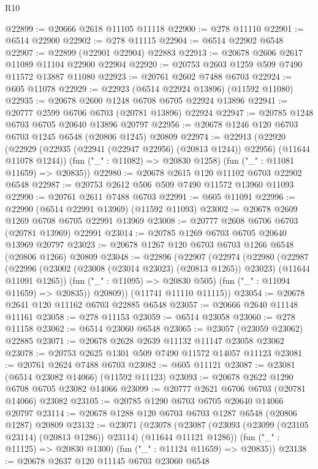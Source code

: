 \begin{lexlean}{R10}
\begin{coremodule}
@22899 := @20666 @2618 @11105 @11118
@22900 := @278 @11110
@22901 := @6514 @22900
@22902 := @278 @11115
@22904 := @6514 @22902 @6548
@22907 := @22899 (@22901 @22904) @22883
@22913 := @20678 @2606 @2617 @11089 @11104 @22900 @22904
@22920 := @20753 @2603 @1259 @509 @7490 @11572 @13887 @11080
@22923 := @20761 @2602 @7488 @6703
@22924 := @605 @11078
@22929 := @22923 (@6514 @22924 @13896) (@11592 @11080)
@22935 := @20678 @2600 @1248 @6708 @6705 @22924 @13896
@22941 := @20777 @2599 @6706 @6703 (@20781 @13896) @22924
@22947 := @20785 @1248 @6703 @6705 @20640 @13896 @20797
@22956 := @20678 @1246 @120 @6703 @6703 @1245 @6548 (@20806 @1245) @20809
@22974 := @22913
    (@22920
      (@22929 (@22935 (@22941 (@22947 @22956) (@20813 @1244)) @22956) (@11644 @11078 @1244))
      (fun ("_" : @11082) => @20830 @1258)
      (fun ("_" : @11081 @11659) => @20835))
@22980 := @20678 @2615 @120 @11102 @6703 @22902 @6548
@22987 := @20753 @2612 @506 @509 @7490 @11572 @13960 @11093
@22990 := @20761 @2611 @7488 @6703
@22991 := @605 @11091
@22996 := @22990 (@6514 @22991 @13969) (@11592 @11093)
@23002 := @20678 @2609 @1269 @6708 @6705 @22991 @13969
@23008 := @20777 @2608 @6706 @6703 (@20781 @13969) @22991
@23014 := @20785 @1269 @6703 @6705 @20640 @13969 @20797
@23023 := @20678 @1267 @120 @6703 @6703 @1266 @6548 (@20806 @1266) @20809
@23048 := @22896
    (@22907
      (@22974
        (@22980
          (@22987
            (@22996 (@23002 (@23008 (@23014 @23023) (@20813 @1265)) @23023) (@11644 @11091 @1265))
            (fun ("_" : @11095) => @20830 @505)
            (fun ("_" : @11094 @11659) => @20835))
          @20809))
      (@11741 @11110 @11115))
@23054 := @20678 @2641 @120 @11162 @6703 @22885 @6548
@23057 := @20666 @2640 @11148 @11161
@23058 := @278 @11153
@23059 := @6514 @23058
@23060 := @278 @11158
@23062 := @6514 @23060 @6548
@23065 := @23057 (@23059 @23062) @22885
@23071 := @20678 @2628 @2639 @11132 @11147 @23058 @23062
@23078 := @20753 @2625 @1301 @509 @7490 @11572 @14057 @11123
@23081 := @20761 @2624 @7488 @6703
@23082 := @605 @11121
@23087 := @23081 (@6514 @23082 @14066) (@11592 @11123)
@23093 := @20678 @2622 @1290 @6708 @6705 @23082 @14066
@23099 := @20777 @2621 @6706 @6703 (@20781 @14066) @23082
@23105 := @20785 @1290 @6703 @6705 @20640 @14066 @20797
@23114 := @20678 @1288 @120 @6703 @6703 @1287 @6548 (@20806 @1287) @20809
@23132 := @23071
    (@23078
      (@23087 (@23093 (@23099 (@23105 @23114) (@20813 @1286)) @23114) (@11644 @11121 @1286))
      (fun ("_" : @11125) => @20830 @1300)
      (fun ("_" : @11124 @11659) => @20835))
@23138 := @20678 @2637 @120 @11145 @6703 @23060 @6548

\end{coremodule}
\end{lexlean}
